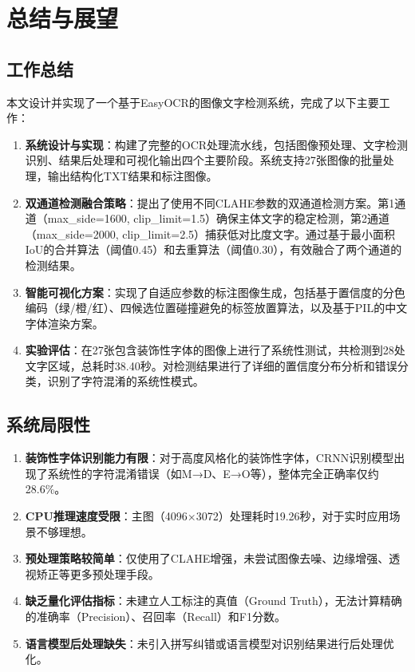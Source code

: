 \documentclass[12pt,hyperref,a4paper,UTF8]{ctexart}
\begin{document}
\clearpage

\section{总结与展望}

\subsection{工作总结}

本文设计并实现了一个基于EasyOCR的图像文字检测系统，完成了以下主要工作：

\begin{enumerate}
    \item \textbf{系统设计与实现}：构建了完整的OCR处理流水线，包括图像预处理、文字检测识别、结果后处理和可视化输出四个主要阶段。系统支持27张图像的批量处理，输出结构化TXT结果和标注图像。
    \item \textbf{双通道检测融合策略}：提出了使用不同CLAHE参数的双通道检测方案。第1通道（max\_side=1600, clip\_limit=1.5）确保主体文字的稳定检测，第2通道（max\_side=2000, clip\_limit=2.5）捕获低对比度文字。通过基于最小面积IoU的合并算法（阈值0.45）和去重算法（阈值0.30），有效融合了两个通道的检测结果。
    \item \textbf{智能可视化方案}：实现了自适应参数的标注图像生成，包括基于置信度的分色编码（绿/橙/红）、四候选位置碰撞避免的标签放置算法，以及基于PIL的中文字体渲染方案。
    \item \textbf{实验评估}：在27张包含装饰性字体的图像上进行了系统性测试，共检测到28处文字区域，总耗时38.40秒。对检测结果进行了详细的置信度分布分析和错误分类，识别了字符混淆的系统性模式。
\end{enumerate}

\subsection{系统局限性}

\begin{enumerate}
    \item \textbf{装饰性字体识别能力有限}：对于高度风格化的装饰性字体，CRNN识别模型出现了系统性的字符混淆错误（如M→D、E→O等），整体完全正确率仅约28.6\%。
    \item \textbf{CPU推理速度受限}：主图（4096×3072）处理耗时19.26秒，对于实时应用场景不够理想。
    \item \textbf{预处理策略较简单}：仅使用了CLAHE增强，未尝试图像去噪、边缘增强、透视矫正等更多预处理手段。
    \item \textbf{缺乏量化评估指标}：未建立人工标注的真值（Ground Truth），无法计算精确的准确率（Precision）、召回率（Recall）和F1分数。
    \item \textbf{语言模型后处理缺失}：未引入拼写纠错或语言模型对识别结果进行后处理优化。
\end{enumerate}
\end{document}
